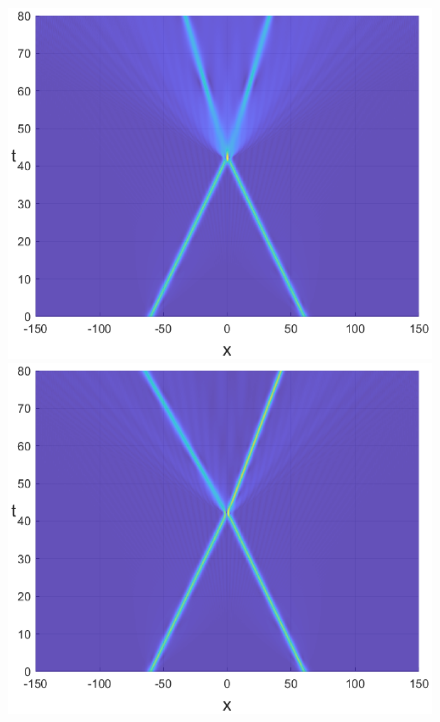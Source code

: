 \documentclass[preprint,12pt]{elsarticle}
\begin{document}
\begin{figure}[H]
\begin{minipage}[h]{0.32\linewidth}
\includegraphics[width=1\linewidth]{fig53.eps}
\end{minipage}
\begin{minipage}[h]{0.32\linewidth}
\includegraphics[width=1\linewidth]{fig56.eps}
\end{minipage}

\end{figure}
\end{document}
